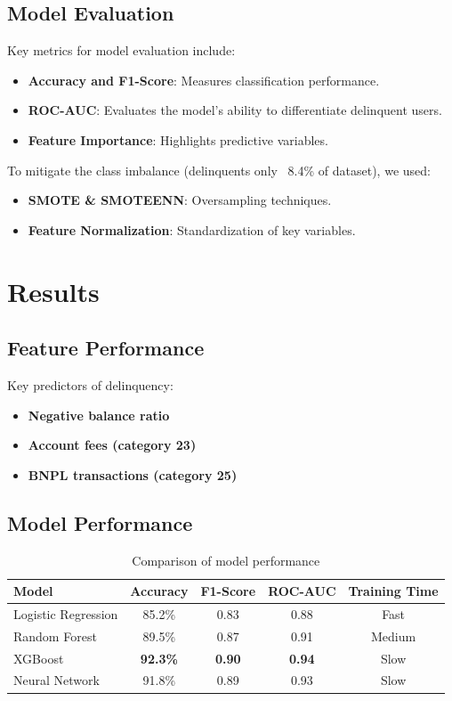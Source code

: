 \documentclass[12pt,letterpaper]{article}
\begin{document}
\subsection{Model Evaluation}
Key metrics for model evaluation include:
\begin{itemize}
    \item \textbf{Accuracy and F1-Score}: Measures classification performance.
    \item \textbf{ROC-AUC}: Evaluates the model's ability to differentiate delinquent users.
    \item \textbf{Feature Importance}: Highlights predictive variables.
\end{itemize}
To mitigate the class imbalance (delinquents only ~8.4\% of dataset), we used:
\begin{itemize}
    \item \textbf{SMOTE \& SMOTEENN}: Oversampling techniques.
    \item \textbf{Feature Normalization}: Standardization of key variables.
\end{itemize}

\section{Results}

\subsection{Feature Performance}
Key predictors of delinquency:
\begin{itemize}
    \item \textbf{Negative balance ratio}
    \item \textbf{Account fees (category 23)}
    \item \textbf{BNPL transactions (category 25)}
\end{itemize}

\subsection{Model Performance}
\begin{table}[H]
    \centering
    \begin{tabular}{|l|c|c|c|c|}
        \hline
        Model & Accuracy & F1-Score & ROC-AUC & Training Time \\
        \hline
        Logistic Regression & 85.2\% & 0.83 & 0.88 & Fast \\
        Random Forest & 89.5\% & 0.87 & 0.91 & Medium \\
        XGBoost & \textbf{92.3\%} & \textbf{0.90} & \textbf{0.94} & Slow \\
        Neural Network & 91.8\% & 0.89 & 0.93 & Slow \\
        \hline
    \end{tabular}
    \caption{Comparison of model performance}
\end{table}
\end{document}
